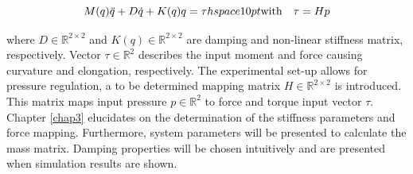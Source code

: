 \begin{equation}
    M(q)\Ddot{q} + D\dot{q} + K(q)q = \tau  hspace{10pt} \text{with} \hspace{10pt} \tau = Hp
    \label{eq2:simp_model}
\end{equation}

where $D \in \mathbb{R}^{2 \times 2}$ and $K(q) \in \mathbb{R}^{2 \times 2}$ are damping and non-linear stiffness matrix, respectively. Vector $\tau \in \mathbb{R}^2$ describes the input moment and force causing curvature and elongation, respectively. The experimental set-up allows for pressure regulation, a to be determined mapping matrix $H \in \mathbb{R}^{2\times2}$ is introduced. This matrix maps input pressure $p \in \mathbb{R}^2$ to force and torque input vector $\tau$. Chapter \ref{chap3} elucidates on the determination of the stiffness parameters and force mapping. Furthermore, system parameters will be presented to calculate the mass matrix. Damping properties will be chosen intuitively and are presented when simulation results are shown.










